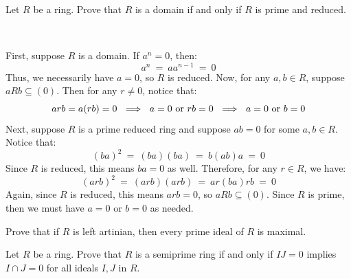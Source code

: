 \nq
\begin{exr}[title=Exercise 10.3]
	Let $R$ be a ring.
	Prove that $R$ is a domain if and only if $R$ is prime and reduced.
\end{exr} \

\begin{pf}
	First, suppose $R$ is a domain. If $a^{n}=0$, then:
	\begin{equation*}
		a^{n} \ = \ aa^{n-1} \ = \ 0
	\end{equation*}
	Thus, we necessarily have $a=0$, so $R$ is reduced.
	Now, for any $a,b\in R$, suppose $aRb\subseteq(0)$.
	Then for any $r\neq0$, notice that:
	\begin{equation*}
		arb = a(rb) = 0 \ \implies \ a = 0 \textrm{ or } rb = 0
		\ \implies \ a = 0 \textrm{ or } b = 0
	\end{equation*}
	Next, suppose $R$ is a prime reduced ring and suppose $ab=0$ for some $a,b\in R$.
	Notice that:
	\begin{equation*}
		(ba)^{2} \ = \ (ba)(ba) \ = \ b(ab)a \ = \ 0
	\end{equation*}
	Since $R$ is reduced, this means $ba=0$ as well.
	Therefore, for any $r\in R$, we have:
	\begin{equation*}
		(arb)^{2} \ = \ (arb)(arb) \ = \ ar(ba)rb \ = \ 0
	\end{equation*}
	Again, since $R$ is reduced, this means $arb=0$, so $aRb\subseteq(0)$.
	Since $R$ is prime, then we must have $a=0$ or $b=0$ as needed.
\end{pf}


\nq
\begin{exr}[title=Exercise 10.4] %
	Prove that if $R$ is left artinian, then every prime ideal of $R$ is maximal.
\end{exr}


\nq
\begin{exr}[title=Exercise 10.8] %
	Let $R$ be a ring. Prove that $R$ is a semiprime ring if and only if
	$IJ=0$ implies $I\cap J=0$ for all ideals $I,J$ in $R$.
\end{exr}
